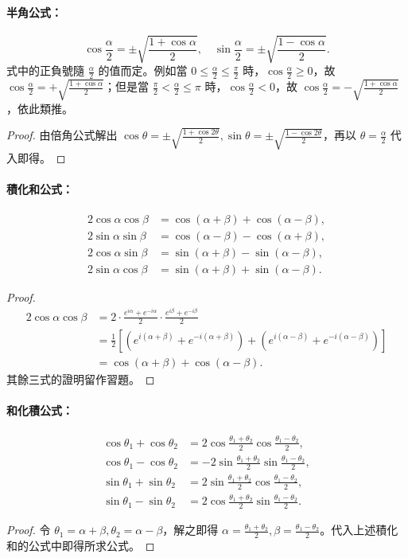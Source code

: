 \paragraph{半角公式：}
\[
\cos\frac{\alpha}{2} = \pm\sqrt{\frac{1+\cos\alpha}{2}}, \quad \sin\frac{\alpha}{2} = \pm\sqrt{\frac{1-\cos\alpha}{2}}.
\]
式中的正負號隨 $\frac{\alpha}{2}$ 的值而定。例如當 $0 \le \frac{\alpha}{2} \le \frac{\pi}{2}$ 時，$\cos\frac{\alpha}{2} \ge 0$，故 $\cos\frac{\alpha}{2} = +\sqrt{\frac{1+\cos\alpha}{2}}$；但是當 $\frac{\pi}{2} < \frac{\alpha}{2} \le \pi$ 時，$\cos\frac{\alpha}{2} < 0$，故 $\cos\frac{\alpha}{2} = -\sqrt{\frac{1+\cos\alpha}{2}}$，依此類推。
\begin{proof}
由倍角公式解出 $\cos\theta = \pm\sqrt{\frac{1+\cos 2\theta}{2}}, \sin\theta = \pm\sqrt{\frac{1-\cos 2\theta}{2}}$，再以 $\theta=\frac{\alpha}{2}$ 代入即得。
\end{proof}

\paragraph{積化和公式：}
\begin{align*}
2\cos\alpha\cos\beta &= \cos(\alpha+\beta)+\cos(\alpha-\beta), \\
2\sin\alpha\sin\beta &= \cos(\alpha-\beta)-\cos(\alpha+\beta), \\
2\cos\alpha\sin\beta &= \sin(\alpha+\beta)-\sin(\alpha-\beta), \\
2\sin\alpha\cos\beta &= \sin(\alpha+\beta)+\sin(\alpha-\beta).
\end{align*}
\begin{proof}
\begin{align*}
2\cos\alpha\cos\beta &= 2\cdot\frac{e^{i\alpha}+e^{-i\alpha}}{2}\cdot\frac{e^{i\beta}+e^{-i\beta}}{2} \\
&= \frac{1}{2}\left[(e^{i(\alpha+\beta)}+e^{-i(\alpha+\beta)}) + (e^{i(\alpha-\beta)}+e^{-i(\alpha-\beta)})\right] \\
&= \cos(\alpha+\beta)+\cos(\alpha-\beta).
\end{align*}
其餘三式的證明留作習題。
\end{proof}

\paragraph{和化積公式：}
\begin{align*}
\cos\theta_1+\cos\theta_2 &= 2\cos\frac{\theta_1+\theta_2}{2}\cos\frac{\theta_1-\theta_2}{2}, \\
\cos\theta_1-\cos\theta_2 &= -2\sin\frac{\theta_1+\theta_2}{2}\sin\frac{\theta_1-\theta_2}{2}, \\
\sin\theta_1+\sin\theta_2 &= 2\sin\frac{\theta_1+\theta_2}{2}\cos\frac{\theta_1-\theta_2}{2}, \\
\sin\theta_1-\sin\theta_2 &= 2\cos\frac{\theta_1+\theta_2}{2}\sin\frac{\theta_1-\theta_2}{2}.
\end{align*}
\begin{proof}
令 $\theta_1 = \alpha+\beta, \theta_2 = \alpha-\beta$，解之即得 $\alpha = \frac{\theta_1+\theta_2}{2}, \beta = \frac{\theta_1-\theta_2}{2}$。代入上述積化和的公式中即得所求公式。
\end{proof}

